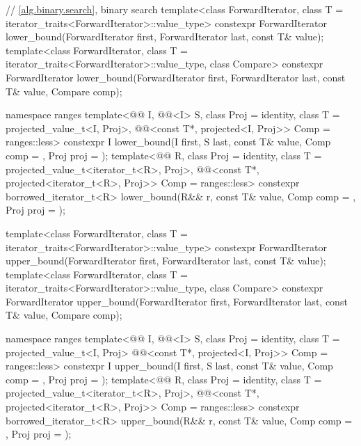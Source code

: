 \begin{codeblock}
{  // \ref{alg.binary.search}, binary search
  template<class ForwardIterator, class T = iterator_traits<ForwardIterator>::value_type>
    constexpr ForwardIterator
      lower_bound(ForwardIterator first, ForwardIterator last,
                  const T& value);
  template<class ForwardIterator, class T = iterator_traits<ForwardIterator>::value_type,
           class Compare>
    constexpr ForwardIterator
      lower_bound(ForwardIterator first, ForwardIterator last,
                  const T& value, Compare comp);

  namespace ranges {
    template<@@ I, @@<I> S, class Proj = identity,
             class T = projected_value_t<I, Proj>,
             @@<const T*, projected<I, Proj>> Comp = ranges::less>
      constexpr I lower_bound(I first, S last, const T& value, Comp comp = {},
                              Proj proj = {});
    template<@@ R, class Proj = identity,
             class T = projected_value_t<iterator_t<R>, Proj>,
             @@<const T*, projected<iterator_t<R>, Proj>> Comp =
               ranges::less>
      constexpr borrowed_iterator_t<R>
        lower_bound(R&& r, const T& value, Comp comp = {}, Proj proj = {});
  }

  template<class ForwardIterator, class T = iterator_traits<ForwardIterator>::value_type>
    constexpr ForwardIterator
      upper_bound(ForwardIterator first, ForwardIterator last,
                  const T& value);
  template<class ForwardIterator, class T = iterator_traits<ForwardIterator>::value_type,
           class Compare>
    constexpr ForwardIterator
      upper_bound(ForwardIterator first, ForwardIterator last,
                  const T& value, Compare comp);

  namespace ranges {
    template<@@ I, @@<I> S, class Proj = identity,
             class T = projected_value_t<I, Proj>
             @@<const T*, projected<I, Proj>> Comp = ranges::less>
      constexpr I upper_bound(I first, S last, const T& value, Comp comp = {}, Proj proj = {});
    template<@@ R, class Proj = identity,
             class T = projected_value_t<iterator_t<R>, Proj>,
             @@<const T*, projected<iterator_t<R>, Proj>> Comp =
               ranges::less>
      constexpr borrowed_iterator_t<R>
        upper_bound(R&& r, const T& value, Comp comp = {}, Proj proj = {});
  }

}
\end{codeblock}
